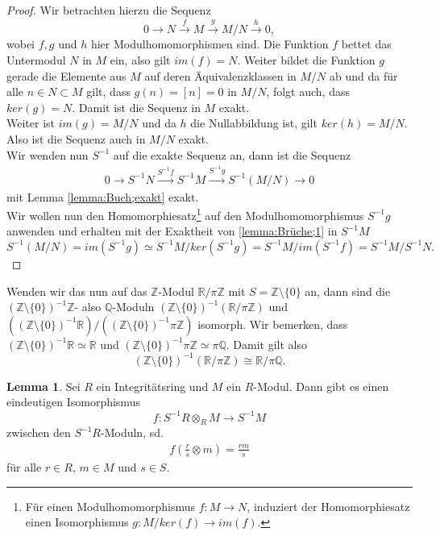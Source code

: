 \documentclass[11pt,titlepage]{article}
\newcommand{\setZ}{\mathbb{Z}}
\newcommand{\setQ}{\mathbb{Q}}
\newcommand{\setR}{\mathbb{R}}
\theoremstyle{definition}
\newtheorem{lemma}[theorem]{Lemma}
\theoremstyle{remark}
\begin{document}
	\begin{proof}
		Wir betrachten hierzu die Sequenz
		\[0\to N\xrightarrow{f} M\xrightarrow{g} M/N\xrightarrow{h} 0,\]
		wobei $f,g$ und $h$ hier Modulhomomorphismen sind. Die Funktion 
		$f$ bettet das Untermodul $N$ in $M$ ein, also gilt 
		$im(f)=N$. Weiter bildet die Funktion $g$ gerade die Elemente aus $M$ 
		auf deren Äquivalenzklassen in $M/N$ ab und da für alle $n\in N\subset M$ 
		gilt, dass $g(n)=[n]=0$ in $M/N$, folgt auch, dass $ker(g)=N$. Damit 
		ist die Sequenz in $M$ exakt. \\
		Weiter ist $im(g)=M/N$ und da $h$ die Nullabbildung ist, gilt $ker(h)=M/N$. 
		Also ist die Sequenz auch in $M/N$ exakt. \\
		Wir wenden nun $S^{-1}$ auf die exakte Sequenz an, dann ist die Sequenz
		\begin{align}
			0\to S^{-1}N \xrightarrow{S^{-1}f} S^{-1}M \xrightarrow{S^{-1}g}
			S^{-1}(M/N)\to 0 \label{lemma:Brüche;1}
		\end{align}
		mit Lemma \ref{lemma:Buch;exakt} exakt. \\
		Wir wollen nun den Homomorphiesatz\footnote{Für einen Modulhomomorphismus 
		$f:M\to N$, induziert der Homomorphiesatz einen Isomorphismus 
		$g:M/ker(f)\to im(f)$.} auf den Modulhomomorphismus 
		$S^{-1}g$ anwenden und erhalten mit der Exaktheit von \ref{lemma:Brüche;1} 
		in $S^{-1}M$
		\[ S^{-1}(M/N)=im(S^{-1}g)\simeq S^{-1}M/ker(S^{-1}g) =S^{-1}M/im(S^{-1}f)=S^{-1}M/S^{-1}N.\]
	\end{proof}
	
	Wenden wir das nun auf das $\setZ$-Modul $\setR /\pi\setZ$ mit 
	$S=\setZ\setminus\{0\}$ an, dann sind die $(\setZ\setminus\{0\})^{-1}\setZ$- also $\setQ$-Moduln 
	$(\setZ\setminus\{0\})^{-1}(\setR /\pi\setZ)$ und 
	$\left((\setZ\setminus\{0\})^{-1}\setR\right) /\left((\setZ\setminus\{0\})^{-1}\pi\setZ\right)$ 
	isomorph. Wir bemerken, dass $(\setZ\setminus\{0\})^{-1}\setR\simeq\setR$ und 
	$(\setZ\setminus\{0\})^{-1}\pi\setZ\simeq\pi\setQ$. Damit gilt also 
	\[ (\setZ\setminus\{0\})^{-1}(\setR /\pi\setZ)\cong \setR/\pi\setQ.\]
	
	\begin{lemma} \label{lemma:lociso}
		Sei $R$ ein Integritätsring und $M$ ein $R$-Modul. Dann gibt es einen 
		eindeutigen Isomorphismus
		\[f:S^{-1}R\otimes_R M\to S^{-1}M\]
		zwischen den $S^{-1}R$-Moduln, sd.
		\begin{align}
			f\left(\frac{r}{s}\otimes m\right)=\frac{rm}{s} \label{lemma:lociso;1}
		\end{align}
		für alle $r\in R$, $m\in M$ und $s\in S$.
	\end{lemma}
	
\end{document}
